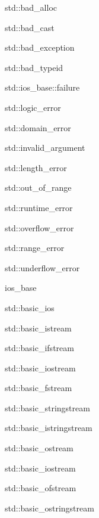 \begin{CompactList}
\begin{CompactList}
\item std::bad\_\-alloc\item std::bad\_\-cast\item std::bad\_\-exception\item std::bad\_\-typeid\item std::ios\_\-base::failure\item std::logic\_\-error\begin{CompactList}
\item std::domain\_\-error\item std::invalid\_\-argument\item std::length\_\-error\item std::out\_\-of\_\-range\end{CompactList}
\item std::runtime\_\-error\begin{CompactList}
\item std::overflow\_\-error\item std::range\_\-error\item std::underflow\_\-error\end{CompactList}
\end{CompactList}
\item {}
\item ios\_\-base\begin{CompactList}
\item std::basic\_\-ios\begin{CompactList}
\item std::basic\_\-istream\begin{CompactList}
\item std::basic\_\-ifstream\item std::basic\_\-iostream\begin{CompactList}
\item std::basic\_\-fstream\item std::basic\_\-stringstream\end{CompactList}
\item std::basic\_\-istringstream\end{CompactList}
\item std::basic\_\-ostream\begin{CompactList}
\item std::basic\_\-iostream\item std::basic\_\-ofstream\item std::basic\_\-ostringstream\end{CompactList}

\end{CompactList}
\end{CompactList}
\end{CompactList}
